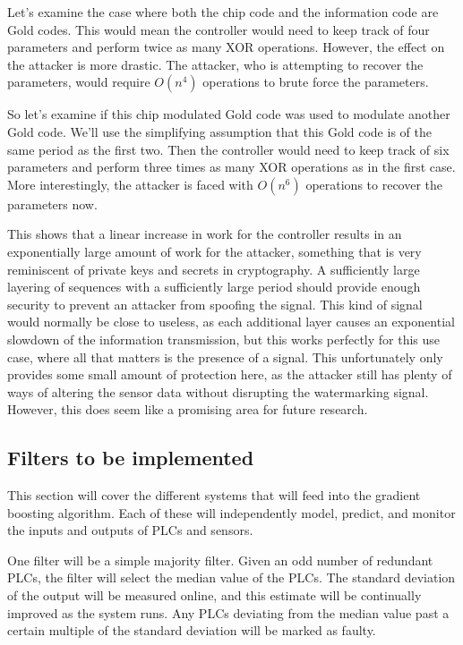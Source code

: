 \documentclass[10pt,twocolumn]{IEEEtran}
\begin{document}
Let's examine the case where both the chip code and the information code are Gold codes.
This would mean the controller would need to keep track of four parameters and perform twice as many XOR operations.
However, the effect on the attacker is more drastic.
The attacker, who is attempting to recover the parameters, would require $O(n^4)$ operations to brute force the parameters.

So let's examine if this chip modulated Gold code was used to modulate another Gold code.
We'll use the simplifying assumption that this Gold code is of the same period as the first two.
Then the controller would need to keep track of six parameters and perform three times as many XOR operations as in the first case.
More interestingly, the attacker is faced with $O(n^6)$ operations to recover the parameters now.

This shows that a linear increase in work for the controller results in an exponentially large amount of work for the attacker, something that is very reminiscent of private keys and secrets in cryptography.
A sufficiently large layering of sequences with a sufficiently large period should provide enough security to prevent an attacker from spoofing the signal.
This kind of signal would normally be close to useless, as each additional layer causes an exponential slowdown of the information transmission, but this works perfectly for this use case, where all that matters is the presence of a signal.
This unfortunately only provides some small amount of protection here, as the attacker still has plenty of ways of altering the sensor data without disrupting the watermarking signal.
However, this does seem like a promising area for future research.

\subsection{Filters to be implemented}
This section will cover the different systems that will feed into the gradient boosting algorithm.
Each of these will independently model, predict, and monitor the inputs and outputs of PLCs and sensors.

One filter will be a simple majority filter.
Given an odd number of redundant PLCs, the filter will select the median value of the PLCs.
The standard deviation of the output will be measured online, and this estimate will be continually improved as the system runs.
Any PLCs deviating from the median value past a certain multiple of the standard deviation will be marked as faulty.
\end{document}
